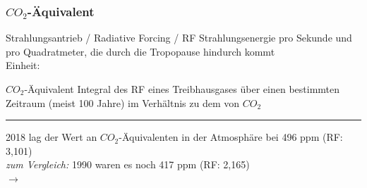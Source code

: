\begin{frame}
	\frametitle{$CO_2$-Äquivalent}
	
	\begin{block}{Strahlungsantrieb / Radiative Forcing / RF}
		Strahlungsenergie pro Sekunde und pro Quadratmeter, die durch die Tropopause hindurch kommt \\
		Einheit: %
	\end{block}
	
	\begin{block}{$CO_2$-Äquivalent}
		Integral des RF eines Treibhausgases über einen bestimmten Zeitraum (meist 100 Jahre) im Verhältnis zu dem von $CO_2$
		
	\end{block}


	\color{gray}\rule{\linewidth}{1pt}
	
	\color{black}

	2018 lag der Wert an $CO_2$-Äquivalenten in der Atmosphäre bei 496 ppm (RF: 3,101)\\
	\textit{zum Vergleich: } 1990 waren es noch 417 ppm (RF: 2,165)\\
	$\rightarrow$ \color{red}{Zuwachs des Strahlungsantriebs um 43 \% seit 1990}
\end{frame}


